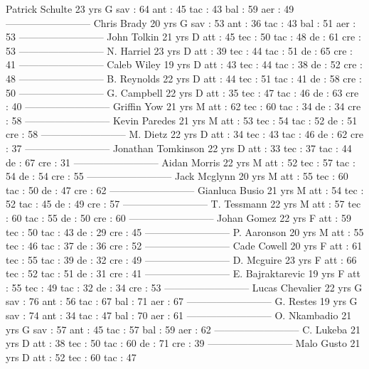 Patrick Schulte  23 yrs 
G 
 sav : 64 
 ant : 45 
 tac : 43 
 bal : 59 
 aer : 49 
--------------------------
Chris Brady  20 yrs 
G 
 sav : 53 
 ant : 36 
 tac : 43 
 bal : 51 
 aer : 53 
--------------------------
John Tolkin  21 yrs 
D 
 att : 45 
 tec : 50 
 tac : 48 
 de : 61 
 cre : 53 
--------------------------
N. Harriel  23 yrs 
D 
 att : 39 
 tec : 44 
 tac : 51 
 de : 65 
 cre : 41 
--------------------------
Caleb Wiley  19 yrs 
D 
 att : 43 
 tec : 44 
 tac : 38 
 de : 52 
 cre : 48 
--------------------------
B. Reynolds  22 yrs 
D 
 att : 44 
 tec : 51 
 tac : 41 
 de : 58 
 cre : 50 
--------------------------
G. Campbell  22 yrs 
D 
 att : 35 
 tec : 47 
 tac : 46 
 de : 63 
 cre : 40 
--------------------------
Griffin Yow  21 yrs 
M 
 att : 62 
 tec : 60 
 tac : 34 
 de : 34 
 cre : 58 
--------------------------
Kevin Paredes  21 yrs 
M 
 att : 53 
 tec : 54 
 tac : 52 
 de : 51 
 cre : 58 
--------------------------
M. Dietz  22 yrs 
D 
 att : 34 
 tec : 43 
 tac : 46 
 de : 62 
 cre : 37 
--------------------------
Jonathan Tomkinson  22 yrs 
D 
 att : 33 
 tec : 37 
 tac : 44 
 de : 67 
 cre : 31 
--------------------------
Aidan Morris  22 yrs 
M 
 att : 52 
 tec : 57 
 tac : 54 
 de : 54 
 cre : 55 
--------------------------
Jack Mcglynn  20 yrs 
M 
 att : 55 
 tec : 60 
 tac : 50 
 de : 47 
 cre : 62 
--------------------------
Gianluca Busio  21 yrs 
M 
 att : 54 
 tec : 52 
 tac : 45 
 de : 49 
 cre : 57 
--------------------------
T. Tessmann  22 yrs 
M 
 att : 57 
 tec : 60 
 tac : 55 
 de : 50 
 cre : 60 
--------------------------
Johan Gomez  22 yrs 
F 
 att : 59 
 tec : 50 
 tac : 43 
 de : 29 
 cre : 45 
--------------------------
P. Aaronson  20 yrs 
M 
 att : 55 
 tec : 46 
 tac : 37 
 de : 36 
 cre : 52 
--------------------------
Cade Cowell  20 yrs 
F 
 att : 61 
 tec : 55 
 tac : 39 
 de : 32 
 cre : 49 
--------------------------
D. Mcguire  23 yrs 
F 
 att : 66 
 tec : 52 
 tac : 51 
 de : 31 
 cre : 41 
--------------------------
E. Bajraktarevic  19 yrs 
F 
 att : 55 
 tec : 49 
 tac : 32 
 de : 34 
 cre : 53 
--------------------------
Lucas Chevalier  22 yrs 
G 
 sav : 76 
 ant : 56 
 tac : 67 
 bal : 71 
 aer : 67 
--------------------------
G. Restes  19 yrs 
G 
 sav : 74 
 ant : 34 
 tac : 47 
 bal : 70 
 aer : 61 
--------------------------
O. Nkambadio  21 yrs 
G 
 sav : 57 
 ant : 45 
 tac : 57 
 bal : 59 
 aer : 62 
--------------------------
C. Lukeba  21 yrs 
D 
 att : 38 
 tec : 50 
 tac : 60 
 de : 71 
 cre : 39 
--------------------------
Malo Gusto  21 yrs 
D 
 att : 52 
 tec : 60 
 tac : 47 
